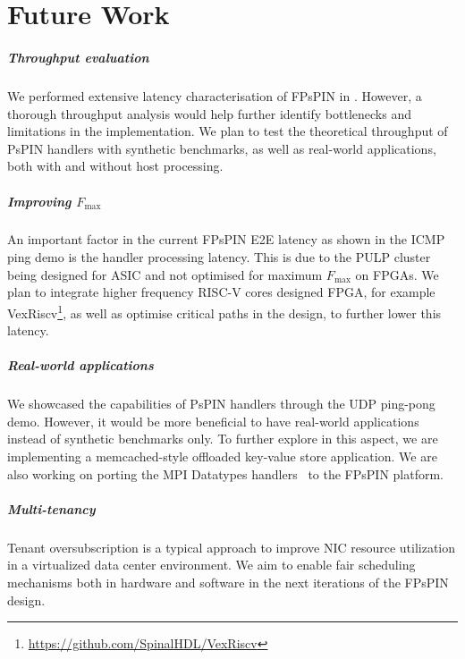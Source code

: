 \chapter{Future Work}

\paragraph{Throughput evaluation} We performed extensive latency characterisation of FPsPIN in .  However, a thorough throughput analysis would help further identify bottlenecks and limitations in the implementation.  We plan to test the theoretical throughput of PsPIN handlers with synthetic benchmarks, as well as real-world applications, both with and without host processing.

\paragraph{Improving $F_{\text{max}}$} An important factor in the current FPsPIN E2E latency as shown in the ICMP ping demo is the handler processing latency.  This is due to the PULP cluster being designed for ASIC and not optimised for maximum $F_{\text{max}}$ on FPGAs.  We plan to integrate higher frequency RISC-V cores designed FPGA, for example VexRiscv\footnote{\url{https://github.com/SpinalHDL/VexRiscv}}, as well as optimise critical paths in the design, to further lower this latency.


\paragraph{Real-world applications} We showcased the capabilities of PsPIN handlers through the UDP ping-pong demo.  However, it would be more beneficial to have real-world applications instead of synthetic benchmarks only.  To further explore in this aspect, we are implementing a memcached-style offloaded key-value store application.  We are also working on porting the MPI Datatypes handlers~\cite{Di_Girolamo_2019} to the FPsPIN platform.

\paragraph{Multi-tenancy} Tenant oversubscription is a typical approach to improve NIC resource utilization in a virtualized data center environment. We aim to enable fair scheduling mechanisms both in hardware and software in the next iterations of the FPsPIN design.
